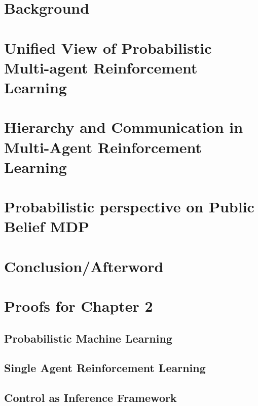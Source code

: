 \documentclass{report}
\begin{document}
\chapter{Background}


\chapter{Unified View of Probabilistic Multi-agent Reinforcement Learning}


\chapter{Hierarchy and Communication in Multi-Agent Reinforcement Learning}


\chapter{Probabilistic perspective on Public Belief MDP}


\chapter{Conclusion/Afterword}


\appendix

% 



\chapter{Proofs for Chapter 2}

\section {Probabilistic Machine Learning}


\section {Single Agent Reinforcement Learning}


\section {Control as Inference Framework}

\end{document}
